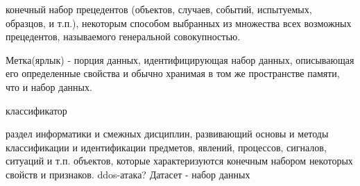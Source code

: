 \Defines %
\begin{description}
	
	\item[Выборка/выборка данных]  конечный набор прецедентов (объектов, случаев, событий, испытуемых, образцов, и т.п.), некоторым способом выбранных из множества всех возможных прецедентов, называемого генеральной совокупностью\cite{def01}.
	\item Метка(ярлык)  - порция данных, идентифицирующая набор данных, описывающая его определенные свойства и обычно хранимая в том же пространстве памяти, что и набор данных\cite{def02}.
	
	классификатор
	\item[Теория распознавания образа] раздел информатики и смежных дисциплин, развивающий основы и методы классификации и идентификации предметов, явлений, процессов, сигналов, ситуаций и т.п. объектов, которые характеризуются конечным набором некоторых свойств и признаков.
	ddos-атака?
	Датасет - набор данных\cite{def03}
	
\end{description}

